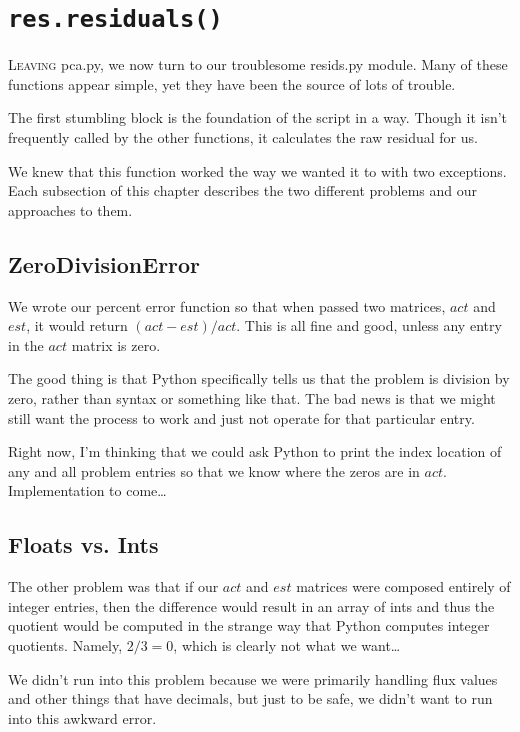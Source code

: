\documentclass{article}
\begin{document}
\section{\texttt{res.residuals()}}
\label{sec:residuals}
\textsc{Leaving} pca.py, we now turn to our troublesome resids.py
module.  Many of these functions appear simple, yet they have been the
source of lots of trouble.

The first stumbling block is the foundation of the script in a way.
Though it isn't frequently called by the other functions, it
calculates the raw residual for us.

We knew that this function worked the way we wanted it to with two
exceptions.  Each subsection of this chapter describes the two
different problems and our approaches to them.

\subsection{ZeroDivisionError}
\label{sec:zerodivision}
We wrote our percent error function so that when passed two matrices,
$act$ and $est$, it would return $(act - est)/act$.  This is all fine
and good, unless any entry in the $act$ matrix is zero.

The good thing is that Python specifically tells us that the problem
is division by zero, rather than syntax or something like that.  The
bad news is that we might still want the process to work and just not
operate for that particular entry.

Right now, I'm thinking that we could ask Python to print the index
location of any and all problem entries so that we know where the
zeros are in $act$.  Implementation to come\ldots

\subsection{Floats vs. Ints}
\label{sec:float}

The other problem was that if our $act$ and $est$ matrices were
composed entirely of integer entries, then the difference would result in
an array of ints and thus the quotient would be computed in the
strange way that Python computes integer quotients.  Namely, $2/3 = 0$,
which is clearly not what we want\ldots

We didn't run into this problem because we were primarily handling
flux values and other things that have decimals, but just to be safe,
we didn't want to run into this awkward error.
\end{document}
